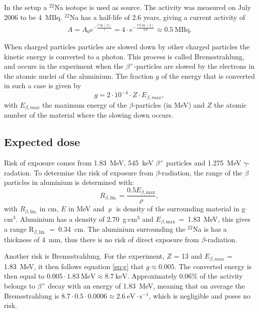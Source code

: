 In the setup a $^{22}$Na isotope is used as source. The activity was measured on July  2006 to be 4~MBq. $^{22}$Na has a half-life of 2.6 years, giving a current activity of \begin{gather*}
	A = A_0e^{-\frac{t\ln(2)}{\tau}} = 4\cdot e^{-\frac{7.6\ln(2)}{2.6}} \approx 0.5~\text{MBq}.
\end{gather*}

When charged particles particles are slowed down by other charged particles the kinetic energy is converted to a photon. This process is called Bremsstrahlung, and occurs in the experiment when the $\beta^+$-particles are slowed by the electrons in the atomic nuclei of the aluminium. The fraction $g$ of the energy that is converted in such a case is given by\begin{equation}
g = 2 \cdot 10^{-4} \cdot Z \cdot E_{\beta, max},
\label{eq:g}
\end{equation}with $E_{\beta, max}$ the maximum energy of the $\beta$-particles (in MeV) and $Z$ the atomic number of the material where the slowing down occurs. 

\subsection*{Expected dose}
Risk of exposure comes from 1.83~MeV, 545~keV $\beta^{+}$ particles and 1.275~MeV $\gamma$-radation. To determine the risk of exposure from $\beta$-radiation, the range of the $\beta$ particles in aluminium is determined with: \begin{equation*}
R_{\beta,\text{lin.}}=\frac{0.5 E_{\beta,\text{max}}}{\rho},
\end{equation*} with $R_{\beta,\text{lin.}}$ in cm, $E$ in MeV and $\uprho$ is density of the surrounding material in g$\cdot$cm$^{3}$. Aluminium has a density of 2.70~g$\cdot$cm$^{3}$ and $E_{\beta,\text{max}}$~=~1.83~MeV, this gives a range R$_{\beta,\text{lin.}}$~=~0.34~cm. The aluminium surrounding the $^{22}$Na is has a thickness of 4~mm, thus there is no risk of direct exposure from $\beta$-radiation.

Another risk is Bremsstrahlung. For the experiment, $Z$ = 13 and $E_{\beta, max}$ = 1.83~MeV, it then follows equation \ref{eq:g} that $g\approx 0.005$. The converted energy is then equal to $0.005\cdot 1.83~\text{MeV}\approx8.7~\text{keV}$. Approximately 0.06\% of the activity belongs to $\beta^+$ decay with an energy of 1.83~MeV, meaning that on average the Bremsstrahlung is $8.7\cdot 0.5\cdot 0.0006 \approx 2.6~\text{eV}\cdot \text{s}^{-1}$, which is negligible and poses no risk.

